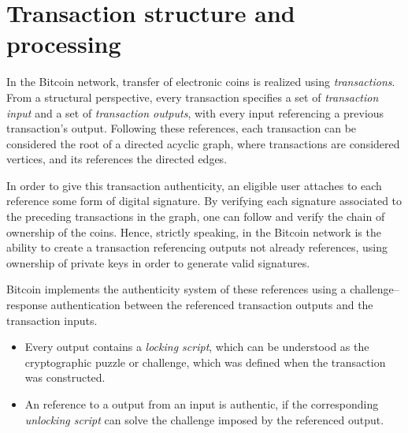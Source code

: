 \documentclass[a4paper,11pt,titlepage]{scrbook}
\begin{document}
\section{Transaction structure and processing}


In the Bitcoin network, transfer of electronic coins is realized using \emph{transactions}.
From a structural perspective, every transaction specifies a set of \emph{transaction input} and a set of \emph{transaction outputs}, with every input referencing a previous transaction's output.
Following these references, each transaction can be considered the root of a directed acyclic graph, where transactions are considered vertices, and its references the directed edges.

In order to give this transaction authenticity, an eligible user attaches to each reference some form of digital signature.
By verifying each signature associated to the preceding transactions in the graph, one can follow and verify the chain of ownership of the coins.
Hence, strictly speaking,  in the Bitcoin network is the ability to create a transaction referencing outputs not already references, using ownership of private keys in order to generate valid signatures.

Bitcoin implements the authenticity system of these references using a challenge–response authentication between the referenced transaction outputs and the transaction inputs.

\begin{itemize}
    \item Every output contains a \emph{locking script}, which can be understood as the cryptographic puzzle or challenge, which was defined when the transaction was constructed.
    \item An reference to a output from an input is authentic, if the corresponding \emph{unlocking script} can solve the challenge imposed by the referenced output.
\end{itemize}
\end{document}
